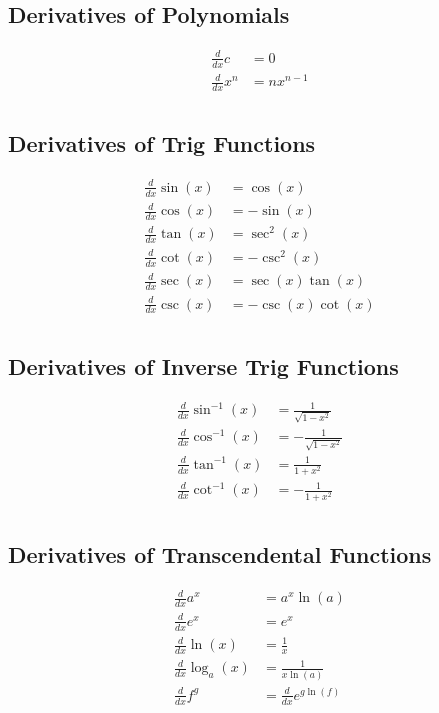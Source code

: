 \documentclass{article}
\begin{document}
\begin{multicols*}{2}
    \subsection*{Derivatives of Polynomials}
    \begin{align*}
        \frac{d}{dx} c &= 0 \\
        \frac{d}{dx} x^n &= nx^{n-1} \\
    \end{align*}

    \subsection*{Derivatives of Trig Functions}
    \begin{align*}
        \frac{d}{dx} \sin(x) &= \cos(x) \\
        \frac{d}{dx} \cos(x) &= -\sin(x) \\
        \frac{d}{dx} \tan(x) &= \sec^2(x) \\
        \frac{d}{dx} \cot(x) &= -\csc^2(x) \\
        \frac{d}{dx} \sec(x) &= \sec(x) \tan(x) \\
        \frac{d}{dx} \csc(x) &= -\csc(x) \cot(x) \\
    \end{align*}

    \subsection*{Derivatives of Inverse Trig Functions}
    \begin{align*}
        \frac{d}{dx} \sin^{-1}(x) &= \frac{1}{\sqrt{1-x^2}} \\
        \frac{d}{dx} \cos^{-1}(x) &= -\frac{1}{\sqrt{1-x^2}} \\
        \frac{d}{dx} \tan^{-1}(x) &= \frac{1}{1+x^2} \\
        \frac{d}{dx} \cot^{-1}(x) &= -\frac{1}{1+x^2} \\
    \end{align*}

    \subsection*{Derivatives of Transcendental Functions}
    \begin{align*}
        \frac{d}{dx} a^x &= a^x \ln(a) \\
        \frac{d}{dx} e^x &= e^x \\
        \frac{d}{dx} \ln(x) &= \frac{1}{x} \\
        \frac{d}{dx} \log_a(x) &= \frac{1}{x \ln(a)} \\
        \frac{d}{dx} f^g &= \frac{d}{dx} e^{g \ln(f)}
    \end{align*}


\end{multicols*}
\end{document}
